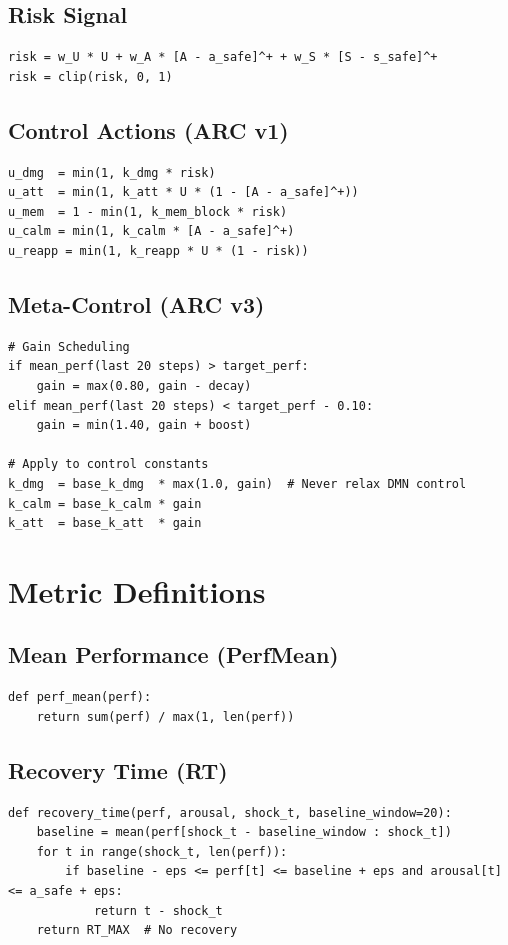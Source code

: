 \documentclass{article}
\begin{document}
\subsection{Risk Signal}

\begin{verbatim}
risk = w_U * U + w_A * [A - a_safe]^+ + w_S * [S - s_safe]^+
risk = clip(risk, 0, 1)
\end{verbatim}

\subsection{Control Actions (ARC v1)}

\begin{verbatim}
u_dmg  = min(1, k_dmg * risk)
u_att  = min(1, k_att * U * (1 - [A - a_safe]^+))
u_mem  = 1 - min(1, k_mem_block * risk)
u_calm = min(1, k_calm * [A - a_safe]^+)
u_reapp = min(1, k_reapp * U * (1 - risk))
\end{verbatim}

\subsection{Meta-Control (ARC v3)}

\begin{verbatim}
# Gain Scheduling
if mean_perf(last 20 steps) > target_perf:
    gain = max(0.80, gain - decay)
elif mean_perf(last 20 steps) < target_perf - 0.10:
    gain = min(1.40, gain + boost)

# Apply to control constants
k_dmg  = base_k_dmg  * max(1.0, gain)  # Never relax DMN control
k_calm = base_k_calm * gain
k_att  = base_k_att  * gain
\end{verbatim}

\section{Metric Definitions}

\subsection{Mean Performance (PerfMean)}
\begin{verbatim}
def perf_mean(perf):
    return sum(perf) / max(1, len(perf))
\end{verbatim}

\subsection{Recovery Time (RT)}
\begin{verbatim}
def recovery_time(perf, arousal, shock_t, baseline_window=20):
    baseline = mean(perf[shock_t - baseline_window : shock_t])
    for t in range(shock_t, len(perf)):
        if baseline - eps <= perf[t] <= baseline + eps and arousal[t] <= a_safe + eps:
            return t - shock_t
    return RT_MAX  # No recovery
\end{verbatim}
\end{document}
